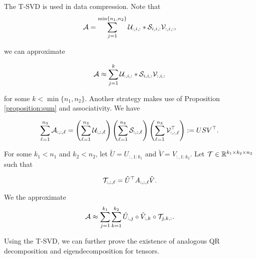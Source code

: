The T-SVD is used in data compression. Note that
\begin{equation}
    \mathcal{A} = \sum\limits_{j = 1}^{\min\{n_1,n_2\}} \mathcal{U}_{:,i,:}*\mathcal{S}_{i,i,:}\mathcal{V}_{:,i,:},
\end{equation}

we can approximate

\begin{equation}
    \mathcal{A} \approx \sum\limits_{j = 1}^{k} \mathcal{U}_{:,i,:}*\mathcal{S}_{i,i,:}\mathcal{V}_{:,i,:}
\end{equation}

for some $k < \min\{n_1,n_2\}$. Another strategy makes use of Proposition \ref{proposition:sum} and associativity. We have

$$\sum\limits_{\ell=1}^{n_3}\mathcal{A}_{:,:,\ell} = \left(\sum\limits_{\ell=1}^{n_3}\mathcal{U}_{:,:,\ell}\right)\left(\sum\limits_{\ell=1}^{n_3}\mathcal{S}_{:,:,\ell}\right)\left(\sum\limits_{\ell=1}^{n_3}\mathcal{V}_{:,:,\ell}^\top\right) := USV^\top.$$

For some $k_1<n_1$ and $k_2<n_2$, let $\tilde{U} = U_{:, 1:k_1}$ and $\tilde{V} = V_{:, 1:k_2}$. Let $\mathcal{T}\in{\mathbb{R}}^{k_1\times k_2\times n_3}$ such that

$$\mathcal{T}_{:,:,\ell} = \tilde{U}^\top A_{:,:,\ell} \tilde{V}.$$

We the approximate
\begin{equation}
    \mathcal{A} \approx \sum\limits_{j=1}^{k_1}\sum\limits_{k=1}^{k_2} \tilde{U}_{:,j}\circ \tilde{V}_{:,k} \circ \mathcal{T}_{j,k,:}.
\end{equation}

Using the T-SVD, we can further prove the existence of analogous QR decomposition and eigendecomposition for tensors.


